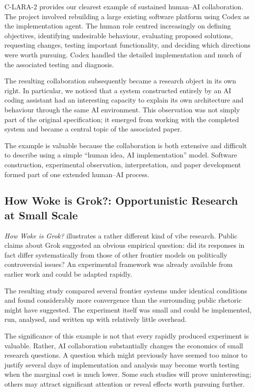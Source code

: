 C-LARA-2 provides our clearest example of sustained human--AI collaboration. The project involved rebuilding a large existing software platform using Codex as the implementation agent. The human role centred increasingly on defining objectives, identifying undesirable behaviour, evaluating proposed solutions, requesting changes, testing important functionality, and deciding which directions were worth pursuing. Codex handled the detailed implementation and much of the associated testing and diagnosis.

The resulting collaboration subsequently became a research object in its own right. In particular, we noticed that a system constructed entirely by an AI coding assistant had an interesting capacity to explain its own architecture and behaviour through the same AI environment. This observation was not simply part of the original specification; it emerged from working with the completed system and became a central topic of the associated paper.

The example is valuable because the collaboration is both extensive and difficult to describe using a simple ``human idea, AI implementation'' model. Software construction, experimental observation, interpretation, and paper development formed part of one extended human--AI process.


\subsection{How Woke is Grok?: Opportunistic Research at Small Scale}

\emph{How Woke is Grok?} illustrates a rather different kind of vibe research. Public claims about Grok suggested an obvious empirical question: did its responses in fact differ systematically from those of other frontier models on politically controversial issues? An experimental framework was already available from earlier work and could be adapted rapidly.

The resulting study compared several frontier systems under identical conditions and found considerably more convergence than the surrounding public rhetoric might have suggested. The experiment itself was small and could be implemented, run, analysed, and written up with relatively little overhead.

The significance of this example is not that every rapidly produced experiment is valuable. Rather, AI collaboration substantially changes the economics of small research questions. A question which might previously have seemed too minor to justify several days of implementation and analysis may become worth testing when the marginal cost is much lower. Some such studies will prove uninteresting; others may attract significant attention or reveal effects worth pursuing further.

